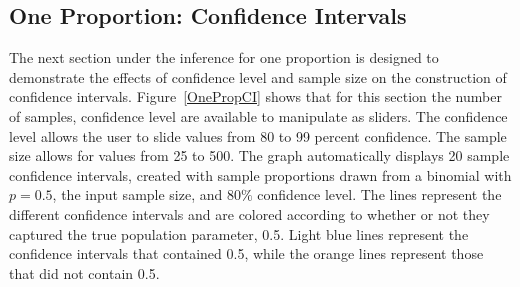 \documentclass[11pt]{book}
\begin{document}
\subsection{One Proportion: Confidence Intervals}
The next section under the inference for one proportion is designed to demonstrate the effects of confidence level and sample size on the construction of confidence intervals. Figure~\ref{OnePropCI} shows that for this section the number of samples, confidence level are available to manipulate as sliders.  The confidence level allows the user to slide values from 80 to 99 percent confidence. The sample size allows for values from 25 to 500.  The graph automatically displays 20 sample confidence intervals, created with sample proportions drawn from a binomial with $p= 0.5$, the input sample size, and $80\%$ confidence level. The lines represent the different confidence intervals and are colored according to whether or not they captured the true population parameter, 0.5.  Light blue lines represent the confidence intervals that contained 0.5, while the orange lines represent those that did not contain 0.5. 
\end{document}
